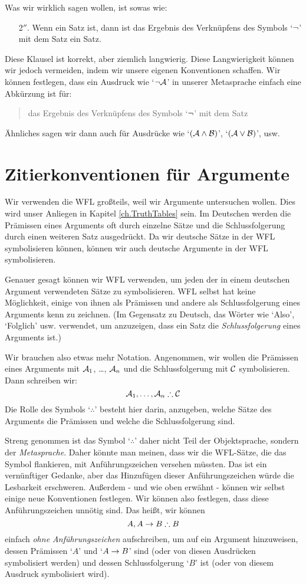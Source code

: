 Was wir wirklich sagen wollen, ist sowas wie:
	\begin{enumerate}
		\item[2$''$.] Wenn  ein Satz ist, dann ist das Ergebnis des Verknüpfens des Symbols `$\neg$' mit dem Satz  ein Satz.
	\end{enumerate}
Diese Klausel ist korrekt, aber ziemlich langwierig. Diese Langwierigkeit können wir jedoch vermeiden, indem wir unsere eigenen Konventionen schaffen. Wir können festlegen, dass ein Ausdruck wie `$\neg \mathcal{A}$' in unserer Metasprache einfach eine Abkürzung ist für:
\begin{quote}
	das Ergebnis des Verknüpfens des Symbols `$\neg$' mit dem Satz 
\end{quote}
Ähnliches sagen wir dann auch für Ausdrücke wie `$(\mathcal{A} \wedge \mathcal{B})$', `$(\mathcal{A} \vee \mathcal{B})$', usw.

\section{Zitierkonventionen für Argumente}
Wir verwenden die WFL gro{\ss}teils, weil wir Argumente untersuchen wollen. Dies wird unser Anliegen in Kapitel \ref{ch.TruthTables} sein. Im Deutschen werden die Prämissen eines Arguments oft durch einzelne Sätze und die Schlussfolgerung durch einen weiteren Satz ausgedrückt. Da wir deutsche Sätze in der WFL symbolisieren können, können wir auch deutsche Argumente in der WFL symbolisieren. 

Genauer gesagt können wir WFL verwenden, um jeden der in einem deutschen Argument verwendeten Sätze zu symbolisieren. WFL selbst hat keine Möglichkeit, einige von ihnen als Prämissen und andere als Schlussfolgerung eines Arguments kenn zu zeichnen. (Im Gegensatz zu Deutsch, das Wörter wie `Also', `Folglich' usw. verwendet, um anzuzeigen, dass ein Satz die \emph{Schlussfolgerung} eines Arguments ist.)

Wir brauchen also etwas mehr Notation. Angenommen, wir wollen die Prämissen eines Arguments mit $\mathcal{A}_1$, \dots, $\mathcal{A}_n$ und die Schlussfolgerung mit $\mathcal{C}$ symbolisieren. Dann schreiben wir:
$$\metav{A}_1, \dots, \metav{A}_n \therefore \metav{C}$$
Die Rolle des Symbols `$\therefore$' besteht hier darin, anzugeben, welche Sätze des Arguments die Prämissen und welche die Schlussfolgerung sind. 

Streng genommen ist das Symbol `$\therefore$' daher nicht Teil der Objektsprache, sondern der \emph{Metasprache}. Daher könnte man meinen, dass wir die WFL-Sätze, die das Symbol flankieren, mit Anführungszeichen versehen müssten. Das ist ein vernünftiger Gedanke, aber das Hinzufügen dieser Anführungszeichen würde die Lesbarkeit erschweren. Au{\ss}erdem - und wie oben erwähnt - können wir selbst einige neue Konventionen festlegen. Wir können also festlegen, dass diese Anführungszeichen unnötig sind. Das hei{\ss}t, wir können 
$$A, A \eif B \therefore B$$
einfach \emph{ohne Anführungszeichen} aufschreiben, um auf ein Argument hinzuweisen, dessen Prämissen `$A$' und `$A \rightarrow B$' sind (oder von diesen Ausdrücken symbolisiert werden) und dessen Schlussfolgerung `$B$' ist (oder von diesem Ausdruck symbolisiert wird). 
